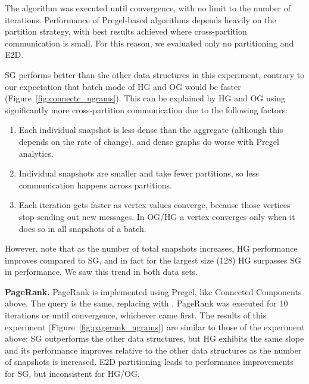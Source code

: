 The algorithm was executed until convergence, with no limit to the
number of iterations.  Performance of Pregel-based algorithms depends
heavily on the partition strategy, with best results achieved where
cross-partition communication is small.  For this reason, we evaluated
only no partitioning and E2D.

SG performs better than the other data structures in this experiment,
contrary to our expectation that batch mode of HG and OG would be
faster (Figure~\ref{fig:connectc_ngrams}).  This can be explained by
HG and OG using significantly more cross-partition communication due
to the following factors:

\begin{enumerate}[leftmargin=*]
\item Each individual snapshot is less dense than the aggregate
  (although this depends on the rate of change), and dense graphs do
  worse with Pregel analytics.
\item Individual snapshots are smaller and take fewer partitions, so
  less communication happens across partitions.
\item Each iteration gets faster as vertex values converge, because
  those vertices stop sending out new messages.  In OG/HG a vertex
  converges only when it does so in all snapshots of a batch.
\end{enumerate}

However, note that as the number of total snapshots increases, HG
performance improves compared to SG, and in fact for the largest size
(128) HG surpasses SG in performance.  We saw this trend in both data
sets.


{\bf PageRank.} PageRank is implemented using Pregel, like Connected
Components above.  The query is the same, replacing 
with .  PageRank was executed for 10 iterations or
until convergence, whichever came first.  The results of this
experiment (Figure~\ref{fig:pagerank_ngrams}) are similar to those of
the experiment above: SG outperforms the other data structures, but HG
exhibits the same slope and its performance improves relative to the
other data structures as the number of snapshots is increased.  E2D
partitioning leads to performance improvements for SG, but
inconsistent for HG/OG.

